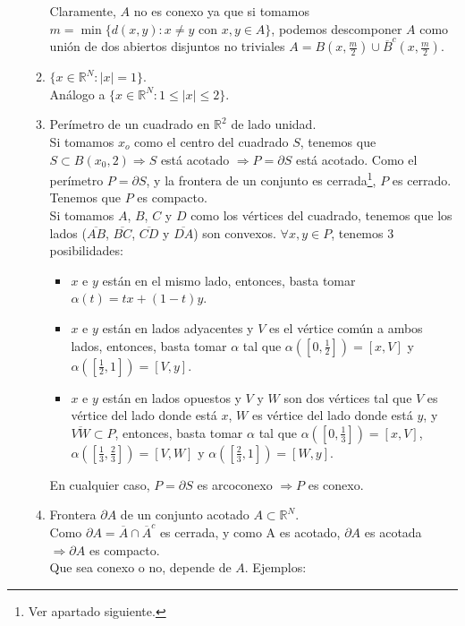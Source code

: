 \documentclass[a4paper, 11pt]{article} %
\begin{document}
\begin{enumerate}
\begin{enumerate}[label=\alph*)]
		Claramente, $A$ no es conexo ya que si tomamos $m=\min\{d(x,y): x \neq y$ con $x,y \in A\}$, podemos descomponer $A$ como unión de dos abiertos disjuntos no triviales $A = B\left(x,\frac{m}{2}\right) \cup \overline{B}^c\left(x,\frac{m}{2}\right)$.
		\item $\{x \in \mathbb{R}^N: |x| = 1\}$.\\
		Análogo a $\{x \in \mathbb{R}^N: 1 \le |x| \le 2\}$.
		\item Perímetro de un cuadrado en $\mathbb{R}^2$ de lado unidad.\\
		Si tomamos $x_o$ como el centro del cuadrado $S$, tenemos que $S \subset B(x_0, 2) \Rightarrow S$ está acotado $\Rightarrow P = \partial S$ está acotado. Como el perímetro $P = \partial S$, y la frontera de un conjunto es cerrada\footnote{Ver apartado siguiente.}, $P$ es cerrado. Tenemos que $P$ es compacto.\\
		Si tomamos $A$, $B$, $C$ y $D$ como los vértices del cuadrado, tenemos que los lados ($\overline{AB}$, $\overline{BC}$, $\overline{CD}$ y $\overline{DA}$) son convexos. $\forall x,y \in P$, tenemos 3 posibilidades:
		\begin{itemize}
			\item $x$ e $y$ están en el mismo lado, entonces, basta tomar $\alpha(t) = tx + (1-t)y$.
			\item $x$ e $y$ están en lados adyacentes y $V$ es el vértice común a ambos lados, entonces, basta tomar $\alpha$ tal que $\alpha\left(\left[0, \frac{1}{2}\right]\right) = [x,V]$ y $\alpha\left(\left[\frac{1}{2},1\right]\right) = [V,y]$.
			\item $x$ e $y$ están en lados opuestos y $V$ y $W$ son dos vértices tal que $V$ es vértice del lado donde está $x$, $W$ es vértice del lado donde está $y$, y $\overline{VW} \subset P$, entonces, basta tomar $\alpha$ tal que $\alpha\left(\left[0, \frac{1}{3}\right]\right) = [x,V]$, $\alpha\left(\left[\frac{1}{3}, \frac{2}{3}\right]\right) = [V,W]$ y $\alpha\left(\left[\frac{2}{3},1\right]\right) = [W,y]$.
		\end{itemize}
		En cualquier caso, $P = \partial S$ es arcoconexo $\Rightarrow P$ es conexo.
		\item Frontera $\partial A$ de un conjunto acotado $A \subset \mathbb{R}^N$.\\
		Como $\partial A = \overline{A} \cap \overline{A}^c$ es cerrada, y como A es acotado, $\partial A$ es acotada $\Rightarrow \partial A$ es compacto.\\
		Que sea conexo o no, depende de $A$. Ejemplos:

\end{enumerate}
\end{enumerate}
\end{document}
